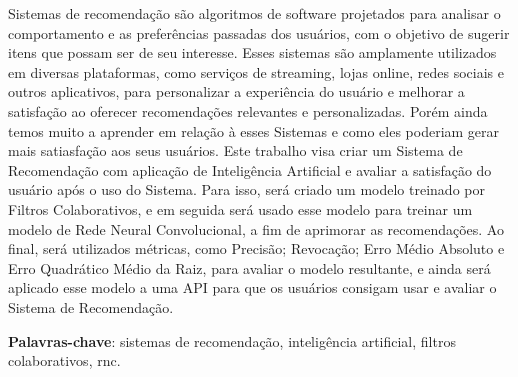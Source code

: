 \begin{resumo}
    Sistemas de recomendação são algoritmos de software projetados para analisar o comportamento e as 
    preferências passadas dos usuários, com o objetivo de sugerir itens que possam ser de seu interesse. 
    Esses sistemas são amplamente utilizados em diversas plataformas, como serviços de streaming, lojas online, 
    redes sociais e outros aplicativos, para personalizar a experiência do usuário e melhorar a satisfação ao oferecer 
    recomendações relevantes e personalizadas. Porém ainda temos muito a aprender em relação à esses Sistemas e como
    eles poderiam gerar mais satiasfação aos seus usuários. Este trabalho visa criar um Sistema de Recomendação com
    aplicação de Inteligência Artificial e avaliar a satisfação do usuário após o uso do Sistema. Para isso, será
    criado um modelo treinado por Filtros Colaborativos, e em seguida será usado esse modelo para treinar um modelo de Rede
    Neural Convolucional, a fim de aprimorar as recomendações. Ao final, será utilizados métricas, como Precisão; Revocação; 
    Erro Médio Absoluto e Erro Quadrático Médio da Raiz, para avaliar o modelo resultante, e ainda será aplicado esse modelo
    a uma API para que os usuários consigam usar e avaliar o Sistema de Recomendação.

 \vspace{\onelineskip}
    
 \noindent
 \textbf{Palavras-chave}: sistemas de recomendação, inteligência artificial, filtros colaborativos, rnc.
\end{resumo}

